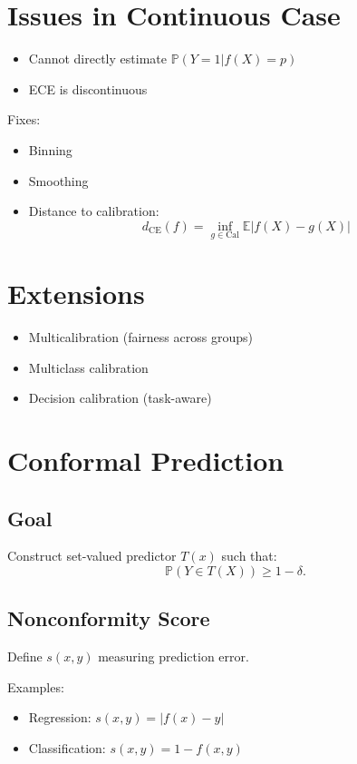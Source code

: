 \documentclass[12pt,oneside]{book}
\numberwithin{equation}{section}
\theoremstyle{definition}
\theoremstyle{plain}
\theoremstyle{remark}
\begin{document}
\section{Issues in Continuous Case}

\begin{itemize}
    \item Cannot directly estimate $\mathbb{P}(Y=1|f(X)=p)$
    \item ECE is discontinuous
\end{itemize}

Fixes:
\begin{itemize}
    \item Binning
    \item Smoothing
    \item Distance to calibration:
    \[
    d_{\text{CE}}(f) = \inf_{g \in \text{Cal}} \mathbb{E}|f(X)-g(X)|
    \]
\end{itemize}

\section{Extensions}

\begin{itemize}
    \item Multicalibration (fairness across groups)
    \item Multiclass calibration
    \item Decision calibration (task-aware)
\end{itemize}

\section{Conformal Prediction}

\subsection{Goal}

Construct set-valued predictor $T(x)$ such that:
\[
\mathbb{P}(Y \in T(X)) \ge 1 - \delta.
\]

\subsection{Nonconformity Score}

Define $s(x,y)$ measuring prediction error.

Examples:
\begin{itemize}
    \item Regression: $s(x,y)=|f(x)-y|$
    \item Classification: $s(x,y)=1-f(x,y)$
\end{itemize}
\end{document}
